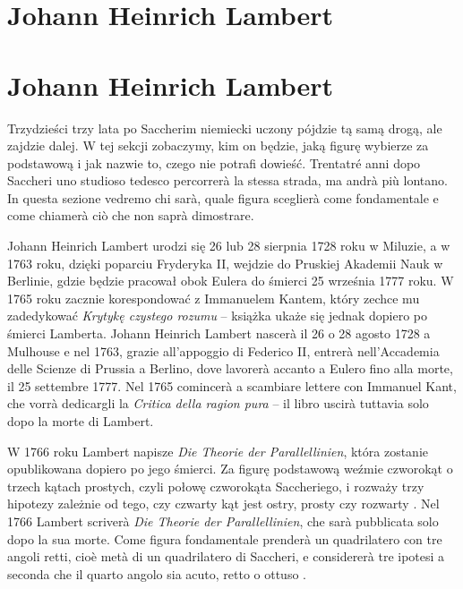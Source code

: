 
\section{Johann Heinrich Lambert} %
\section{Johann Heinrich Lambert} %
\label{sekcja_lambert}

Trzydzieści trzy lata po Saccherim niemiecki uczony pójdzie tą samą drogą, ale zajdzie dalej. %
W tej sekcji zobaczymy, kim on będzie, jaką figurę wybierze za podstawową i jak nazwie to, czego nie potrafi dowieść. %
Trentatré anni dopo Saccheri uno studioso tedesco percorrerà la stessa strada, ma andrà più lontano. %
In questa sezione vedremo chi sarà, quale figura sceglierà come fondamentale e come chiamerà ciò che non saprà dimostrare. %

Johann Heinrich Lambert urodzi się 26 lub 28 sierpnia 1728 roku w Miluzie, a w 1763 roku, dzięki poparciu Fryderyka II, wejdzie do Pruskiej Akademii Nauk w Berlinie, gdzie będzie pracował obok Eulera do śmierci 25 września 1777 roku. %
W 1765 roku zacznie korespondować z Immanuelem Kantem, który zechce mu zadedykować \emph{Krytykę czystego rozumu} -- książka ukaże się jednak dopiero po śmierci Lamberta. %
Johann Heinrich Lambert nascerà il 26 o 28 agosto 1728 a Mulhouse e nel 1763, grazie all'appoggio di Federico II, entrerà nell'Accademia delle Scienze di Prussia a Berlino, dove lavorerà accanto a Eulero fino alla morte, il 25 settembre 1777. %
Nel 1765 comincerà a scambiare lettere con Immanuel Kant, che vorrà dedicargli la \emph{Critica della ragion pura} -- il libro uscirà tuttavia solo dopo la morte di Lambert. %
%
%
%

W 1766 roku Lambert napisze \emph{Die Theorie der Parallellinien}, która zostanie opublikowana dopiero po jego śmierci. %
Za figurę podstawową weźmie czworokąt o trzech kątach prostych, czyli połowę czworokąta Saccheriego, i rozważy trzy hipotezy zależnie od tego, czy czwarty kąt jest ostry, prosty czy rozwarty \cite[s. 285--286]{eves1_1972}. %
Nel 1766 Lambert scriverà \emph{Die Theorie der Parallellinien}, che sarà pubblicata solo dopo la sua morte. %
Come figura fondamentale prenderà un quadrilatero con tre angoli retti, cioè metà di un quadrilatero di Saccheri, e considererà tre ipotesi a seconda che il quarto angolo sia acuto, retto o ottuso \cite[p. 285--286]{eves1_1972}. %

